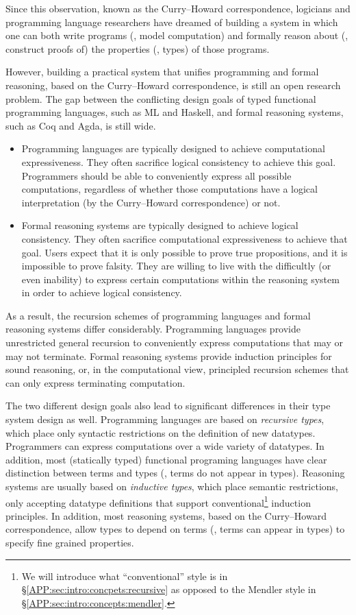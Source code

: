 Since this observation, known as the Curry--Howard correspondence,
logicians and programming language researchers 
have  dreamed of
building a system in which one can both write programs
(\ie, model computation) and formally reason about (\ie, construct proofs of)
the properties (\ie, types) of those programs.

However, building a practical system that unifies programming and
formal reasoning, based on the Curry--Howard correspondence, is still
an open research problem. The gap between the conflicting
design goals of typed functional programming languages, such as ML and Haskell,
and formal reasoning systems, such as Coq and Agda, is still wide.

\begin{itemize}

\item
Programming languages are typically designed to achieve
computational expressiveness. They often sacrifice logical consistency
to achieve this goal. Programmers should be able to
conveniently express all possible computations, regardless of whether those
computations have a logical interpretation (by the Curry--Howard correspondence)
or not.

\item
Formal reasoning systems are typically designed to achieve logical consistency.
They often sacrifice computational expressiveness to achieve that goal.
Users expect that it is only possible to prove true propositions,
and it is impossible to prove falsity. They are willing to live with
the difficultly (or even inability) to express certain computations
within the reasoning system in order to achieve logical consistency.

\end{itemize}

As a result, the recursion schemes of programming languages and
formal reasoning systems differ considerably.
Programming languages provide unrestricted general recursion
to conveniently express computations that may or may not terminate.
Formal reasoning systems provide induction principles for sound reasoning,
or, in the computational view, principled recursion schemes
that can only express terminating computation.

The two different design goals also lead to significant differences
in their type system design as well.
Programming languages are based on \emph{recursive types},
which place only syntactic restrictions on the definition of new datatypes.
Programmers can express computations over a wide variety of datatypes.
In addition, most (statically typed) functional programing languages have
clear distinction between terms and types (\ie, terms do not appear in types).
Reasoning systems are usually based on \emph{inductive types},
which place semantic restrictions, only accepting datatype definitions
that support conventional\footnote{We will introduce
	what ``conventional'' style is in \S\ref{APP:sec:intro:concpets:recursive}
	as opposed to the Mendler style in \S\ref{APP:sec:intro:concepts:mendler}.
	} induction principles.
In addition, most reasoning systems, based on the Curry--Howard correspondence,
allow types to depend on terms (\ie, terms can appear in types) to specify
fine grained properties.

